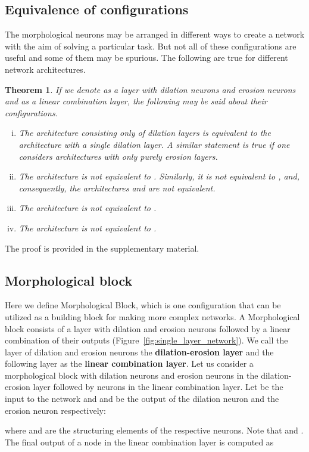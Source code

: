 \documentclass{bmvc2k}
\newtheorem{theorem}{Theorem}
\newcommand{\newterm}[1]{{\bf #1}}
\def\Figref#1{Figure~\ref{#1}}
\begin{document}
\subsection{Equivalence of configurations}
The morphological neurons may be arranged in different ways to create a network with the aim of solving a particular task. But not all of these configurations are useful and some of them may be spurious. The following are true for different network architectures.
\begin{theorem}
If we denote  as a layer with  dilation neurons and  erosion neurons and  as a linear combination layer, the following may be said about their configurations. 
\begin{enumerate}[(i)]
    \item The architecture  consisting only of dilation layers is equivalent to the architecture  with a single dilation layer. A similar statement is true if one considers architectures with only purely erosion layers.
    \item The architecture  is not equivalent to . Similarly, it is not equivalent to , and, consequently, the architectures  and  are not equivalent.
    \item The architecture  is not equivalent to .
    \item The architecture  is not equivalent to .
\end{enumerate}
\end{theorem}
The proof is provided in the supplementary material.


\subsection{Morphological block}
\label{sec:SL_morph}
Here we define Morphological Block, which is one configuration that can be utilized as a building block for making more complex networks. A Morphological block consists of a layer with dilation and erosion neurons followed by a linear combination of their outputs (\Figref{fig:single_layer_network}). We call the layer of dilation and erosion neurons the \newterm{dilation-erosion layer} and the following layer as the \newterm{linear combination layer}. 
Let us consider a morphological block with  dilation neurons and  erosion neurons in the dilation-erosion layer followed by  neurons in the linear combination layer. Let  be the input to the network and  and  be the output of the  dilation neuron and the  erosion neuron respectively: 

where  and  are the structuring elements of the respective neurons. Note that  and . The final output of a node in the linear combination layer is computed as 
\end{document}
